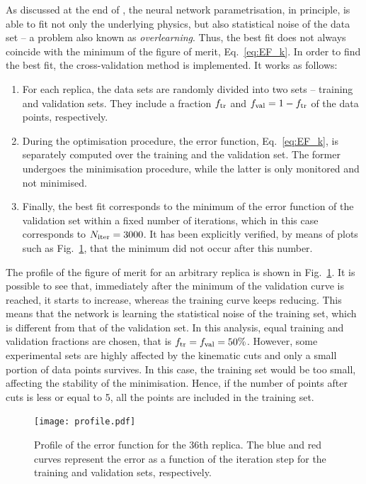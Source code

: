 As discussed at the end of , the neural network parametrisation, in principle, is able to fit not only the underlying physics, but also statistical noise of the data set -- a problem also known as \textit{overlearning}. Thus, the best fit does not always coincide with the minimum of the figure of merit, Eq.~\eqref{eq:EF_k}. In order to find the best fit, the cross-validation method \cite{pml1Book} is implemented. It works as follows:
\begin{enumerate}
  \item For each replica, the data sets are randomly divided into two sets -- training and validation sets. They include a fraction $f_{\textrm{tr}}$ and $f_{\textrm{val}} = 1 - f_{\textrm{tr}}$ of the data points, respectively.
  \item During the optimisation procedure, the error function, Eq.~\eqref{eq:EF_k}, is separately computed over the training and the validation set. The former undergoes the minimisation procedure, while the latter is only monitored and not minimised.
  \item Finally, the best fit corresponds to the minimum of the error function of the validation set within a fixed number of iterations, which in this case corresponds to $N_{\textrm{iter}} = 3000$. It has been explicitly verified, by means of plots such as Fig.~\ref{fig:profile}, that the minimum did not occur after this number.
\end{enumerate}
The profile of the figure of merit for an arbitrary replica is shown in Fig.~\ref{fig:profile}. It is possible to see that, immediately after the minimum of the validation curve is reached, it starts to increase, whereas the training curve keeps reducing. This means that the network is learning the statistical noise of the training set, which is different from that of the validation set. In this analysis, equal training and validation fractions are chosen, that is $f_{\textrm{tr}} = f_{\textrm{val}} = 50\%$. However, some experimental sets are highly affected by the kinematic cuts and only a small portion of data points survives. In this case, the training set would be too small, affecting the stability of the minimisation. Hence, if the number of points after cuts is less or equal to 5, all the points are included in the training set.

\begin{figure}[t]
  \centering
  \texttt{[image: profile.pdf]} 
  \caption{\small{Profile of the error function for the 36th replica. The blue and red curves represent the error as a function of the iteration step for the training and validation sets, respectively.}}
  \label{fig:profile}
\end{figure}

